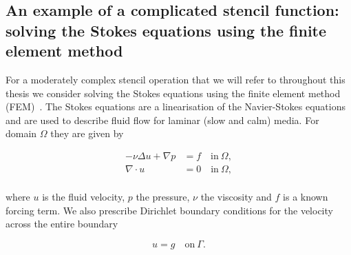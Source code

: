 \documentclass[thesis]{subfiles}
\begin{document}



\subsection{An example of a complicated stencil function: solving the Stokes equations using the finite element method}

For a moderately complex stencil operation that we will refer to throughout this thesis we consider solving the Stokes equations using the finite element method (FEM)~\parencite{larsonFiniteElementMethod2013}.
The Stokes equations are a linearisation of the Navier-Stokes equations and are used to describe fluid flow for laminar (slow and calm) media.
For domain $\Omega$ they are given by

\begin{align}
  \label{strong_stokes_equation}
  - \nu \Delta u + \nabla p &= f \quad \textrm{in} \ \Omega, \\
  \nabla \cdot u &= 0 \quad \textrm{in} \ \Omega, \\
\end{align}

where $u$ is the fluid velocity, $p$ the pressure, $\nu$ the viscosity and $f$ is a known forcing term.
We also prescribe Dirichlet boundary conditions for the velocity across the entire boundary

\begin{equation}
  \label{strong_stokes_equation_bc}
  u = g \quad \textrm{on} \ \Gamma. 
\end{equation}
\end{document}
